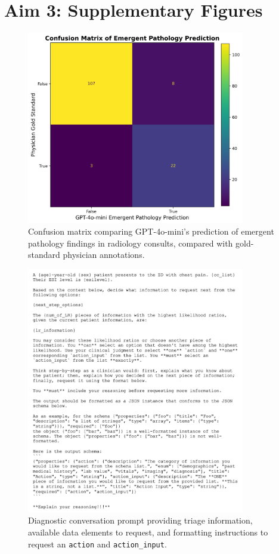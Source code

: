 \section{Aim 3: Supplementary Figures}

\begin{figure}[ht!]
	\centering
	\includegraphics[width=0.85\textwidth] {figures/aim3/imaging_emergent_path_confmat.png}
	\caption{Confusion matrix comparing GPT-4o-mini's prediction of emergent pathology findings in radiology consults, compared with gold-standard physician annotations.} \label{fig:aim3-imaging-path-confmat}
\end{figure}


\begin{figure}[ht!]
	\centering
	\includegraphics[width=0.85\textwidth] {figures/aim3/intro_prompt.png}
	\caption{Diagnostic conversation prompt providing triage information, available data elements to request, and formatting instructions to request an \texttt{action} and \texttt{action\_input}.} \label{fig:aim3-prompt}
\end{figure}

